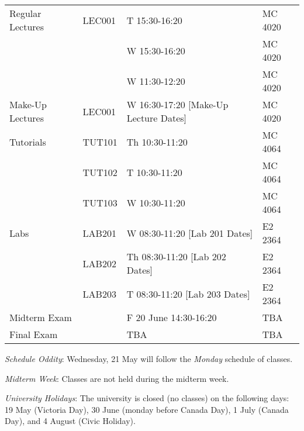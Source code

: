 \documentclass[letterpaper,10pt]{article}
\begin{document}
\begin{table}[h]
        \begin{center}
        \begin{tabular}{l|l|l|l}


                 Regular Lectures & LEC001 & T 15:30-16:20 & MC 4020         \\
                                  &        & W 15:30-16:20 & MC 4020         \\
                                  &        & W 11:30-12:20 & MC 4020         \\
             \hline
                 Make-Up Lectures & LEC001 & W 16:30-17:20 [Make-Up Lecture Dates] & MC 4020         \\
                 \hline
                 Tutorials        & TUT101 & Th  10:30-11:20 & MC 4064         \\
                                  & TUT102 & T 	 10:30-11:20 & MC 4064         \\
                                  & TUT103 & W   10:30-11:20 & MC 4064         \\
                 \hline
                 Labs             & LAB201 & W 08:30-11:20 [Lab 201 Dates]          & E2 2364         \\
                                  & LAB202 & Th 08:30-11:20 [Lab 202 Dates]         & E2 2364         \\
                                  & LAB203 & T 08:30-11:20 [Lab 203 Dates]          & E2 2364         \\
            \hline
            Midterm Exam          &        & F 20 June 14:30-16:20 & TBA \\
            \hline
            Final Exam            &        & TBA                              & TBA       \\
          \end{tabular}
        \end{center}
\end{table}

\textit{Schedule Oddity}: Wednesday, 21 May will follow the \textit{Monday} schedule of classes.

\textit{Midterm Week}: Classes are not held during the midterm week.

\textit{University Holidays}: The university is closed (no classes) on the following days: 19 May (Victoria Day), 30 June (monday before Canada Day), 1 July (Canada Day), and 4 August (Civic Holiday).
\end{document}
